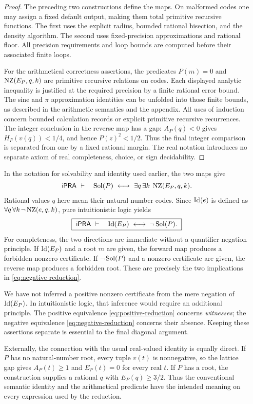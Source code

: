 \begin{proof}
The preceding two constructions define the maps. On malformed codes one
may assign a fixed default output, making them total primitive recursive
functions. The first uses the explicit radius, bounded rational bisection,
and the density algorithm. The second uses fixed-precision approximations
and rational floor. All precision requirements and loop bounds are computed
before their associated finite loops.

For the arithmetical correctness assertions, the predicates $P(m)=0$ and
$\operatorname{NZ}(E_P,q,k)$ are primitive recursive relations on codes. Each displayed
analytic inequality is justified at the required precision by a finite
rational error bound. The sine and $\pi$ approximation identities can be
unfolded into those finite bounds, as described in the arithmetic semantics
and the appendix. All uses of induction concern bounded calculation records
or explicit primitive recursive recurrences. The integer conclusion in the
reverse map has a gap: $A_P(q)<0$ gives $H_P(v(q))<1/4$, and hence
$P(z)^2<1/2$. Thus the final integer comparison is separated from one by
a fixed rational margin. The real notation introduces no separate axiom
of real completeness, choice, or sign decidability.
\end{proof}

In the notation for solvability and identity used earlier, the two maps give
\begin{equation}
 \ipra\ \vdash\quad
 \Sol(P)\ \longleftrightarrow\ 
 \exists q\,\exists k\;\NZ(E_P,q,k).\label{eq:positive-reduction}
\end{equation}
Rational values $q$ here mean their natural-number codes. Since
$\operatorname{Id}(e)$ is defined as $\forall q\,\forall k\,\neg\operatorname{NZ}(e,q,k)$, pure
intuitionistic logic yields
\begin{equation}
 \boxed{\ \ipra\ \vdash\quad
          \Id(E_P)\ \longleftrightarrow\ \neg\Sol(P).\ }
 \label{eq:negative-reduction}
\end{equation}
For completeness, the two directions are immediate without a quantifier
negation principle. If $\operatorname{Id}(E_P)$ and a root $m$ are given, the forward
map produces a forbidden nonzero certificate. If $\neg\operatorname{Sol}(P)$ and a
nonzero certificate are given, the reverse map produces a forbidden root.
These are precisely the two implications in
\eqref{eq:negative-reduction}.

We have not inferred a positive nonzero certificate from the mere negation
of $\operatorname{Id}(E_P)$. In intuitionistic logic, that inference would require an
additional principle. The positive equivalence
\eqref{eq:positive-reduction} concerns \emph{witnesses}; the negative
equivalence \eqref{eq:negative-reduction} concerns their absence. Keeping
these assertions separate is essential to the final diagonal argument.

Externally, the connection with the usual real-valued identity is equally
direct. If $P$ has no natural-number root, every tuple $v(t)$ is
nonnegative, so the lattice gap gives $A_P(t)\ge1$ and $E_P(t)=0$ for
every real $t$. If $P$ has a root, the construction supplies a rational
$q$ with $E_P(q)\ge3/2$. Thus the conventional semantic identity and the
arithmetical predicate have the intended meaning on every expression used
by the reduction.
